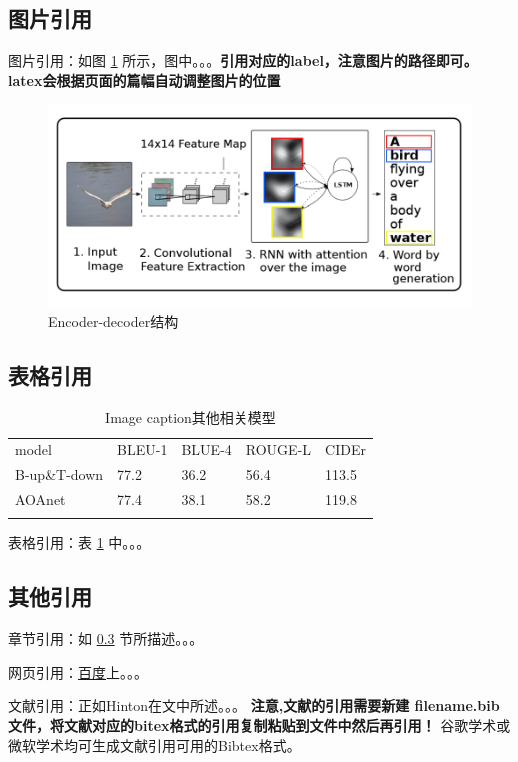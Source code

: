 \documentclass[UTF8,12pt]{article} %
\begin{document}
\subsection{图片引用}
  图片引用：如图 \ref{fig:enc-dec} 所示，图中。。。\textbf{引用对应的label，注意图片的路径即可。}
\textbf{latex会根据页面的篇幅自动调整图片的位置}
\begin{figure}[ht]
  \centering
  \includegraphics[scale=1.2]{figs/pic.png}
  \caption{Encoder-decoder结构}
  \label{fig:enc-dec}
\end{figure}

\subsection{表格引用}
\begin{table}
  \centering
  \begin{tabular}{lllll}
    \hline
    \noalign{\smallskip}
    model & BLEU-1 & BLUE-4 & ROUGE-L & CIDEr  \\
    \noalign{\smallskip}
    \hline
    \noalign{\smallskip}
    B-up\&T-down & 77.2 & 36.2 & 56.4 & 113.5 \\
    AOAnet & 77.4 & 38.1 & 58.2 & 119.8 \\
    \noalign{\smallskip}
    \hline
  \end{tabular}
  \caption{Image caption其他相关模型}
  \label{tab:1}%
\end{table}
  表格引用：表 \ref{tab:1} 中。。。
\subsection{其他引用}\label{anchor-2-3}
  章节引用：如 \ref{anchor-2-3} 节所描述。。。
  
  网页引用：\href{https:www.baidu.con}{百度}上。。。

  文献引用：正如Hinton在文\cite{lecun2015deep}\cite{xu2015show}中所述。。。
\textbf{注意,文献的引用需要新建 filename.bib 文件，将文献对应的bitex格式的引用复制粘贴到文件中然后再引用！}
谷歌学术或微软学术均可生成文献引用可用的Bibtex格式。
\end{document}
